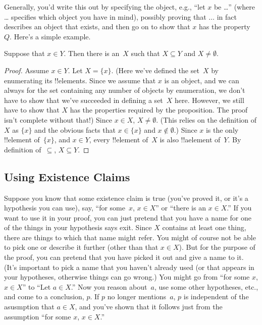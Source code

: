 \documentclass[../../../include/open-logic-section]{subfiles}
\begin{document}
Generally, you'd write this out by specifying the object, e.g., ``let
$x$ be \dots'' (where \dots{} specifies which object you have in
mind), possibly proving that $\dots$ in fact describes an object that
exists, and then go on to show that $x$ has the property~$Q$. Here's a
simple example.

\begin{prop}
  Suppose that $x \in Y$. Then there is an~$X$ such that $X \subseteq
  Y$ and $X \neq \emptyset$.
\end{prop}

\begin{proof}
  Assume $x \in Y$. Let $X = \{x\}$. (Here we've defined the set~$X$
  by enumerating its !!{element}s. Since we assume that $x$ is an
  object, and we can always for the set containing any number of
  objects by enumeration, we don't have to show that we've succeeded
  in defining a set~$X$ here.  However, we still have to show that $X$
  has the properties required by the proposition. The proof isn't
  complete without that!) Since $x \in X$, $X \neq \emptyset$. (This
  relies on the definition of $X$ as $\{x\}$ and the obvious facts
  that $x \in \{x\}$ and $x \notin \emptyset$.) Since $x$ is the only
  !!{element} of~$\{x\}$, and $x \in Y$, every !!{element} of~$X$ is
  also !!a{element} of~$Y$. By definition of~$\subseteq$, $X \subseteq
  Y$.
\end{proof}

\subsection{Using Existence Claims}

Suppose you know that some existence claim is true (you've proved it,
or it's a hypothesis you can use), say, ``for some~$x$, $x \in X$'' or
``there is an $x \in X$.''  If you want to use it in your proof, you
can just pretend that you have a name for one of the things in your
hypothesis says exit. Since $X$ contains at least one thing, there are
things to which that name might refer. You might of course not be able
to pick one or describe it further (other than that $x \in X$). But
for the purpose of the proof, you can pretend that you have picked it
out and give a name to it. (It's important to pick a name that you
haven't already used (or that appears in your hypotheses, otherwise
things can go wrong.) You might go from ``for some $x$, $x \in X$''
to ``Let $a \in X$.''  Now you reason about~$a$, use some other
hypotheses, etc., and come to a conclusion, $p$. If $p$ no longer
mentions~$a$, $p$ is independent of the asusmption that $a \in X$, and
you've shown that it follows just from the assumption ``for some $x$,
$x \in X$.''
\end{document}
